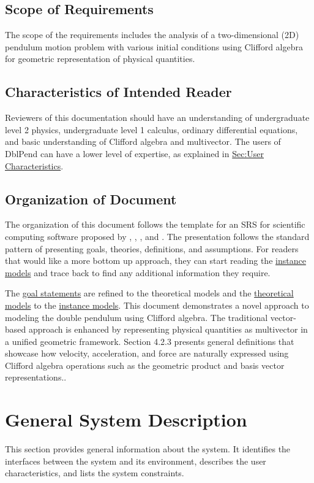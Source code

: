 \documentclass[12pt]{article}
\begin{document}
{\subsection{Scope of Requirements}
\label{Sec:ReqsScope}
The scope of the requirements includes the analysis of a two-dimensional (2D) pendulum motion problem with various initial conditions using Clifford algebra for geometric representation of physical quantities.

\subsection{Characteristics of Intended Reader}
\label{Sec:ReaderChars}
Reviewers of this documentation should have an understanding of undergraduate level 2 physics, undergraduate level 1 calculus, ordinary differential equations, and basic understanding of Clifford algebra and multivector. The users of DblPend can have a lower level of expertise, as explained in \hyperref[Sec:UserChars]{Sec:User Characteristics}.

\subsection{Organization of Document}
\label{Sec:DocOrg}
The organization of this document follows the template for an SRS for scientific computing software proposed by \cite{koothoor2013}, \cite{smithLai2005}, \cite{smithEtAl2007}, and \cite{smithKoothoor2016}. The presentation follows the standard pattern of presenting goals, theories, definitions, and assumptions. For readers that would like a more bottom up approach, they can start reading the \hyperref[Sec:IMs]{instance models} and trace back to find any additional information they require.

The \hyperref[Sec:GoalStmt]{goal statements} are refined to the theoretical models and the \hyperref[Sec:TMs]{theoretical models} to the \hyperref[Sec:IMs]{instance models}. This document demonstrates a novel approach to modeling the double pendulum using Clifford algebra. The traditional vector-based approach is enhanced by representing physical quantities as multivector in a unified geometric framework. Section 4.2.3 presents general definitions that showcase how velocity, acceleration, and force are naturally expressed using Clifford algebra operations such as the geometric product and basis vector representations..

\section{General System Description}
\label{Sec:GenSysDesc}
This section provides general information about the system. It identifies the interfaces between the system and its environment, describes the user characteristics, and lists the system constraints.

}
\end{document}
